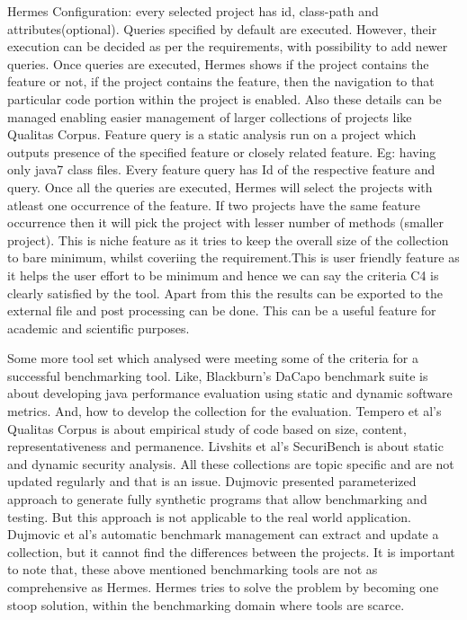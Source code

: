 \documentclass[authoryear,preprint]{sigplanconf}
\begin{document}
Hermes Configuration: every selected project has id, class-path and attributes(optional). Queries specified by default are executed. However, their execution can be decided as per the requirements, with possibility to add newer queries. Once queries are executed, Hermes shows if the project contains the feature or not, if the project contains the feature, then the navigation to that particular code portion within the project is enabled. Also these details can be managed enabling easier management of larger collections of projects like Qualitas Corpus. Feature query is a static analysis run on a project which outputs presence of the specified feature or closely related feature. Eg: having only java7 class files. Every feature query has Id of the respective feature and query. Once all the queries are executed, Hermes will select the projects with atleast one occurrence of the feature. If two projects have the same feature occurrence then it will pick the project with lesser number of methods (smaller project). This is niche feature as it tries to keep the overall size of the collection to bare minimum, whilst coveriing the requirement.This is user friendly feature as it helps the user effort to be minimum and hence we can say the criteria C4 is clearly satisfied by the tool. Apart from this the results can be exported to the external file and post processing can be done. This can be a useful feature for academic and scientific purposes.

Some more tool set which analysed were meeting some of the criteria for a successful benchmarking tool. Like, Blackburn’s DaCapo benchmark suite\cite{Blackburn:2006:DBJ:1167473.1167488} is about developing java performance evaluation using static and dynamic software metrics. And, how to develop the collection for the evaluation. Tempero et al’s Qualitas Corpus is about empirical study of code based on size, content, representativeness and permanence. Livshits et al’s SecuriBench\cite{Livshits_defininga} is about static and dynamic security analysis. All these collections are topic specific and are not updated regularly and that is an issue. Dujmovic presented parameterized approach to generate fully synthetic programs that allow benchmarking and testing. But this approach is not applicable to the real world application. Dujmovic et al’s automatic benchmark management\cite{Dujmovic:2010:AGB:1712605.1712654} can extract and update a collection, but it cannot find the differences between the projects. It is important to note that, these above mentioned benchmarking tools are not as comprehensive as Hermes. Hermes tries to solve the problem by becoming one stoop solution, within the benchmarking domain where tools are scarce.
\end{document}
